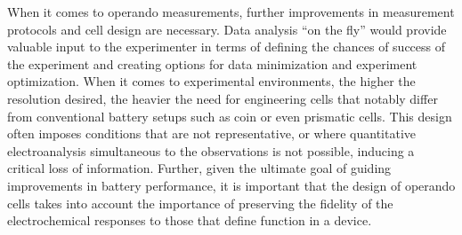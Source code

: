 \documentclass[journal=cmatex,manuscript=perspective]{achemso}
\begin{document}
When it comes to operando measurements, further improvements in
measurement protocols and cell design are necessary. Data analysis ``on
the fly'' would provide valuable input to the experimenter in terms of
defining the chances of success of the experiment and creating options
for data minimization and experiment optimization. When it comes to
experimental environments, the higher the resolution desired, the
heavier the need for engineering cells that notably differ from
conventional battery setups such as coin or even prismatic cells. This
design often imposes conditions that are not representative, or where
quantitative electroanalysis simultaneous to the observations is not
possible, inducing a critical loss of information. Further, given the
ultimate goal of guiding improvements in battery performance, it is
important that the design of operando cells takes into account the
importance of preserving the fidelity of the electrochemical responses
to those that define function in a device.
\end{document}
